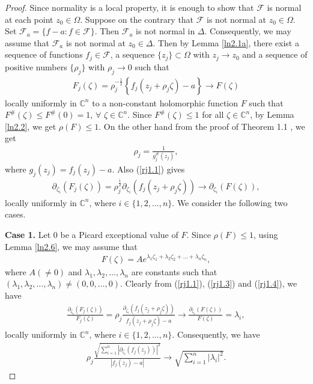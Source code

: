 \documentclass[11pt, reqno]{amsart}
\newtheorem*{cor A}{Corollary A}
\newtheorem*{cor B}{Corollary B}
\numberwithin{equation}{section}
\begin{document}
\begin{proof}
Since normality is a local property, it is enough to show that $\mathcal{F}$ is normal at each point $z_0\in \Omega$.
Suppose on the contrary that $\mathcal{F}$ is not normal at $z_0\in\Omega$. Set $\mathcal{F}_a=\{f-a: f\in\mathcal{F}\}$. Then $\mathcal{F}_a$ is not normal in $\Delta$. Consequently, we may assume that $\mathcal{F}_a$ is not normal at $z_0\in\Delta$. 
Then by Lemma \ref{ln2.1a}, there exist a sequence of functions $f_j\in\mathcal{F}$, a sequence $\{z_j\}\subset\Omega$ with $z_j\rightarrow z_0$ and a sequence of positive numbers $\{\rho_j\}$ with $\rho_j\rightarrow 0$ such that
\begin{align}\label{rj1.1} 
F_j(\zeta)=\rho_j^{-\frac{1}{2}}\left\lbrace f_j(z_j+\rho_j \zeta)-a\right\rbrace\rightarrow F(\zeta)
\end{align}
locally uniformly in $\mathbb{C}^n$ to a non-constant holomorphic function $F$ such that $F^{\#}(\zeta)\leq F^{\#}(0)=1$, $\forall$ $\zeta\in\mathbb{C}^n$. Since $F^{\#}(\zeta)\leq 1$ for all $\zeta\in\mathbb{C}^n$, by Lemma \ref{ln2.2}, we get $\rho(F)\leq 1$.  On the other hand from the proof of Theorem 1.1 \cite{PVD2}, we get
\begin{align}
\label{rj1.2} \rho_{j}=\frac{1}{g_{j}^{\#}(z_{j})},
\end{align}
where $g_j(z_j)=f_{j}(z_{j})-a$. Also (\ref{rj1.1}) gives
\begin{align}\label{rj1.3} 
\partial_{\zeta_i}(F_j(\zeta))=\rho_j^{\frac{1}{2}}\partial_{\zeta_i}(f_j(z_j+\rho_j \zeta))\rightarrow \partial_{\zeta_i}(F(\zeta)),
\end{align}
locally uniformly in $\mathbb{C}^n$, where $i\in\{1,2,\ldots,n\}$. 
We consider the following two cases.\par


\smallskip
{\bf Case 1.} Let $0$ be a Picard exceptional value of $F$. Since $\rho(F)\leq 1$, using Lemma \ref{ln2.6}, we may assume that 
\begin{align}
\label{rj1.4} F(\zeta)=Ae^{\lambda_1 \zeta_1+\lambda_2\zeta_2+\ldots+\lambda_n\zeta_n},
\end{align}
where $A(\neq 0)$ and $\lambda_1,\lambda_2,\ldots,\lambda_n$ are constants such that $(\lambda_1,\lambda_2,\ldots,\lambda_n)\neq (0,0,\ldots,0)$. Clearly from (\ref{rj1.1}), (\ref{rj1.3}) and (\ref{rj1.4}), we have 
\begin{align*}
\frac{\partial_{\zeta_i}(F_j(\zeta))}{F_j(\zeta)}=\rho_{j}\frac{\partial_{\zeta_i}(f_j(z_j+\rho_j \zeta))}{f_j(z_j+\rho_j \zeta)-a}\rightarrow \frac{\partial_{\zeta_i}(F(\zeta))}{F(\zeta)}=\lambda_i,
\end{align*}
locally uniformly in $\mathbb{C}^n$, where $i\in\{1,2,\ldots,n\}$. Consequently, we have
\begin{align}
\label{rj1.5} \rho_{j}\frac{\sqrt{\sum\limits_{i=1}^n|\partial_{\zeta_i}(f_j(z_j))|^2}}{|f_j(z_j)-a|}\rightarrow \sqrt{\sum\limits_{i=1}^n|\lambda_i|^2}.
\end{align}


\end{proof}
\end{document}
